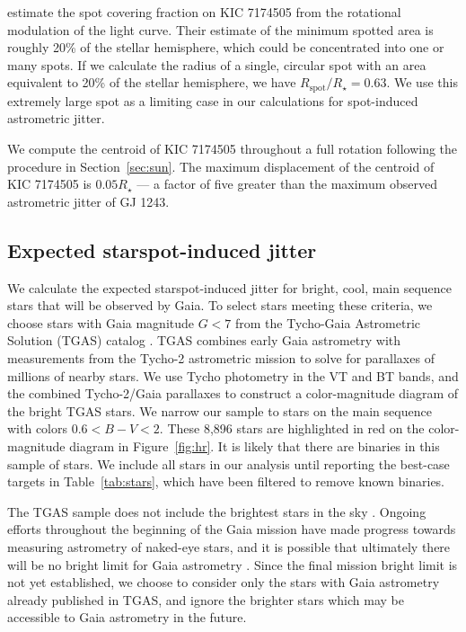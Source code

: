 \citet{Shibayama2013} estimate the spot covering fraction on KIC 7174505 from the rotational modulation of the \kepler light curve. Their estimate of the minimum spotted area is roughly 20\% of the stellar hemisphere, which could be concentrated into one or many spots. If we calculate the radius of a single, circular spot with an area equivalent to 20\% of the stellar hemisphere, we have $R_{\mathrm{spot}}/R_\star = 0.63$. We use this extremely large spot as a limiting case in our calculations for spot-induced astrometric jitter. 

We compute the centroid of KIC 7174505 throughout a full rotation following the procedure in Section~\ref{sec:sun}. The maximum displacement of the centroid of KIC 7174505 is $0.05 R_\star$ --- a factor of five greater than the maximum observed astrometric jitter of GJ 1243. 

\subsection{Expected starspot-induced jitter} \label{sec:jitter}

We calculate the expected starspot-induced jitter for bright, cool, main sequence stars that will be observed by Gaia. To select stars meeting these criteria, we choose stars with Gaia magnitude $G < 7$ from the Tycho-Gaia Astrometric Solution (TGAS) catalog \citep{Michalik2015}. TGAS combines early Gaia astrometry with measurements from the Tycho-2 astrometric mission to solve for parallaxes of millions of nearby stars. We use Tycho photometry in the VT and BT bands, and the combined Tycho-2/Gaia parallaxes to construct a color-magnitude diagram of the bright TGAS stars. We narrow our sample to stars on the main sequence with colors $0.6 < B - V < 2$. These 8,896 stars are highlighted in red on the color-magnitude diagram in Figure~\ref{fig:hr}. It is likely that there are binaries in this sample of stars. We include all stars in our analysis until reporting the best-case targets in Table~\ref{tab:stars}, which have been filtered to remove known binaries.

The TGAS sample does not include the brightest stars in the sky \citep{Michalik2015}. Ongoing efforts throughout the beginning of the Gaia mission have made progress towards measuring astrometry of naked-eye stars, and it is possible that ultimately there will be no bright limit for Gaia astrometry \citep{Martin-Fleitas2014, Sahlmann2016}. Since the final mission bright limit is not yet established, we choose to consider only the stars with Gaia astrometry already published in TGAS, and ignore the brighter stars which may be accessible to Gaia astrometry in the future.  


